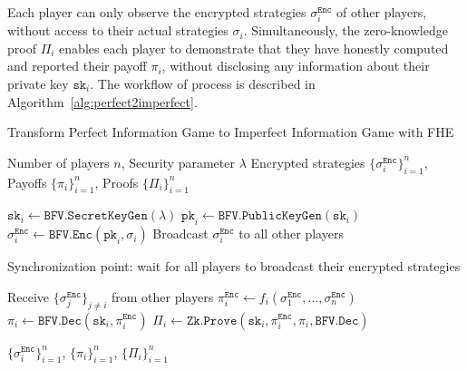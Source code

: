 \documentclass[11pt]{article}
\begin{document}
 Each player can only observe the encrypted strategies $\sigma^\texttt{Enc}_i$ of other players, without access to their actual strategies $\sigma_i$. Simultaneously, the zero-knowledge proof $\Pi_i$ enables each player to demonstrate that they have honestly computed and reported their payoff $\pi_i$, without disclosing any information about their private key $\texttt{sk}_i$. The workflow of process is described in Algorithm~\ref{alg:perfect2imperfect}.

\begin{algorithm}
  \caption{Transform Perfect Information Game to Imperfect Information Game with FHE}
  \label{alg:perfect2imperfect}
  \begin{algorithmic}[1]
  \Require Number of players $n$, Security parameter $\lambda$
  \Ensure Encrypted strategies $\{\sigma^\texttt{Enc}_i\}_{i=1}^n$, Payoffs $\{\pi_i\}_{i=1}^n$, Proofs $\{\Pi_i\}_{i=1}^n$
  
      \State $\texttt{sk}_i \gets \texttt{BFV.SecretKeyGen}(\lambda)$
      \State $\texttt{pk}_i \gets \texttt{BFV.PublicKeyGen}(\texttt{sk}_i)$
      \State $\sigma^\texttt{Enc}_i \gets \texttt{BFV.Enc}(\texttt{pk}_i, \sigma_i)$
      \State Broadcast $\sigma^\texttt{Enc}_i$ to all other players
  \EndFor
  
  \State Synchronization point: wait for all players to broadcast their encrypted strategies
  
      \State Receive $\{\sigma^\texttt{Enc}_j\}_{j \neq i}$ from other players
      \State $\pi^\texttt{Enc}_i \gets f_i(\sigma^\texttt{Enc}_1, \ldots, \sigma^\texttt{Enc}_n)$ 
      \State $\pi_i \gets \texttt{BFV.Dec}(\texttt{sk}_i, \pi^\texttt{Enc}_i)$
      \State $\Pi_i \gets \texttt{Zk.Prove}(\texttt{sk}_i, \pi^\texttt{Enc}_i, \pi_i, \texttt{BFV.Dec})$
  \EndFor
  
  \State \Return $\{\sigma^\texttt{Enc}_i\}_{i=1}^n$, $\{\pi_i\}_{i=1}^n$, $\{\Pi_i\}_{i=1}^n$
  \end{algorithmic}
  \end{algorithm}
\end{document}
